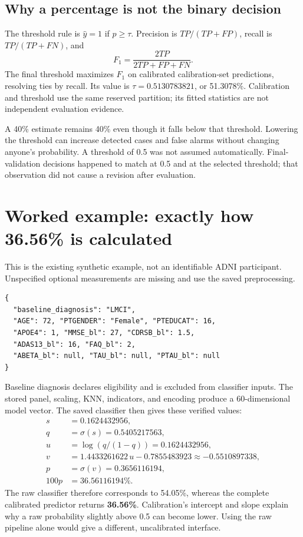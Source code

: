 \subsection{Why a percentage is not the binary decision}
The threshold rule is $\widehat y=1$ if $p\geq\tau$. Precision is $TP/(TP+FP)$, recall is $TP/(TP+FN)$, and
\begin{equation}F_1=\frac{2TP}{2TP+FP+FN}.
\end{equation}
The final threshold maximizes $F_1$ on calibrated calibration-set predictions, resolving ties by recall. Its value is $\tau=0.5130783821$, or 51.3078\%. Calibration and threshold use the same reserved partition; its fitted statistics are not independent evaluation evidence.

A 40\% estimate remains 40\% even though it falls below that threshold. Lowering the threshold can increase detected cases and false alarms without changing anyone's probability. A threshold of 0.5 was not assumed automatically. Final-validation decisions happened to match at 0.5 and at the selected threshold; that observation did not cause a revision after evaluation.
\clearpage

\section{Worked example: exactly how 36.56\% is calculated}
This is the existing synthetic example, not an identifiable ADNI participant. Unspecified optional measurements are missing and use the saved preprocessing.
\begin{verbatim}
{
  "baseline_diagnosis": "LMCI",
  "AGE": 72, "PTGENDER": "Female", "PTEDUCAT": 16,
  "APOE4": 1, "MMSE_bl": 27, "CDRSB_bl": 1.5,
  "ADAS13_bl": 16, "FAQ_bl": 2,
  "ABETA_bl": null, "TAU_bl": null, "PTAU_bl": null
}
\end{verbatim}
Baseline diagnosis declares eligibility and is excluded from classifier inputs. The stored panel, scaling, KNN, indicators, and encoding produce a 60-dimensional model vector. The saved classifier then gives these verified values:
\begin{align}
s&=0.1624432956,\\
q&=\sigma(s)=0.5405217563,\\
u&=\log(q/(1-q))=0.1624432956,\\
v&=1.4433261622\,u-0.7855483923\approx-0.5510897338,\\
p&=\sigma(v)=0.3656116194,\\
100p&=36.56116194\%.
\end{align}
The raw classifier therefore corresponds to 54.05\%, whereas the complete calibrated predictor returns \textbf{36.56\%}. Calibration's intercept and slope explain why a raw probability slightly above 0.5 can become lower. Using the raw pipeline alone would give a different, uncalibrated interface.

